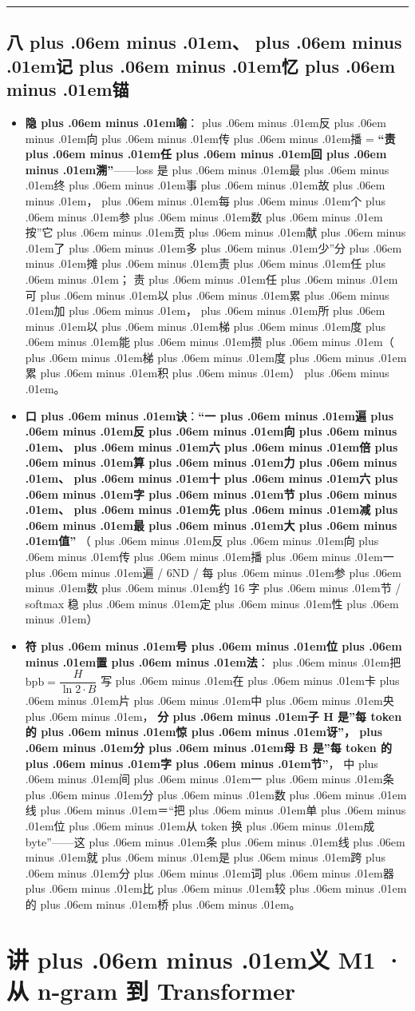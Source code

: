 \documentclass[
]{article}
\providecommand{\tightlist}{%
  \setlength{\itemsep}{0pt}\setlength{\parskip}{0pt}}
\def\zh#1{{\zhfont #1}}
\def\sym#1{{\symfont #1}}
\def\zhglue{\hskip0pt plus .06em minus .01em}
\begin{document}
\begin{center}\rule{0.5\linewidth}{0.5pt}\end{center}

\subsection{\zh{八\zhglue 、\zhglue 记\zhglue 忆\zhglue 锚}}\label{ux516bux8bb0ux5fc6ux951a}

\begin{itemize}
\tightlist
\item
  \textbf{\zh{隐\zhglue 喻}}\zh{：\zhglue 反\zhglue 向\zhglue 传\zhglue 播} = \textbf{``\zh{责\zhglue 任\zhglue 回\zhglue 溯}''}------loss \zh{是\zhglue 最\zhglue 终\zhglue 事\zhglue 故\zhglue ，\zhglue 每\zhglue 个\zhglue 参\zhglue 数\zhglue 按}''\zh{它\zhglue 贡\zhglue 献\zhglue 了\zhglue 多\zhglue 少}''\zh{分\zhglue 摊\zhglue 责\zhglue 任\zhglue ；} \zh{责\zhglue 任\zhglue 可\zhglue 以\zhglue 累\zhglue 加\zhglue ，\zhglue 所\zhglue 以\zhglue 梯\zhglue 度\zhglue 能\zhglue 攒\zhglue （\zhglue 梯\zhglue 度\zhglue 累\zhglue 积\zhglue ）\zhglue 。}
\item
  \textbf{\zh{口\zhglue 诀}}\zh{：}\textbf{``\zh{一\zhglue 遍\zhglue 反\zhglue 向\zhglue 、\zhglue 六\zhglue 倍\zhglue 算\zhglue 力\zhglue 、\zhglue 十\zhglue 六\zhglue 字\zhglue 节\zhglue 、\zhglue 先\zhglue 减\zhglue 最\zhglue 大\zhglue 值}''} \zh{（\zhglue 反\zhglue 向\zhglue 传\zhglue 播\zhglue 一\zhglue 遍} / 6ND / \zh{每\zhglue 参\zhglue 数\zhglue 约} 16 \zh{字\zhglue 节} / softmax \zh{稳\zhglue 定\zhglue 性\zhglue ）}
\item
  \textbf{\zh{符\zhglue 号\zhglue 位\zhglue 置\zhglue 法}}\zh{：\zhglue 把} \(\mathrm{bpb} = \dfrac{H}{\ln 2 \cdot B}\) \zh{写\zhglue 在\zhglue 卡\zhglue 片\zhglue 中\zhglue 央\zhglue ，} \textbf{\zh{分\zhglue 子} H \zh{是}''\zh{每} token \zh{的\zhglue 惊\zhglue 讶}''\zh{，\zhglue 分\zhglue 母} B \zh{是}''\zh{每} token \zh{的\zhglue 字\zhglue 节}''}\zh{，} \zh{中\zhglue 间\zhglue 一\zhglue 条\zhglue 分\zhglue 数\zhglue 线\zhglue ＝}``\zh{把\zhglue 单\zhglue 位\zhglue 从} token \zh{换\zhglue 成} byte''------\zh{这\zhglue 条\zhglue 线\zhglue 就\zhglue 是\zhglue 跨\zhglue 分\zhglue 词\zhglue 器\zhglue 比\zhglue 较\zhglue 的\zhglue 桥\zhglue 。}
\end{itemize}

\newpage

\section{\zh{讲\zhglue 义} M1 \sym{·} \zh{从} n-gram \zh{到} Transformer}\label{ux8bb2ux4e49-m1-ux4ece-n-gram-ux5230-transformer}
\end{document}
